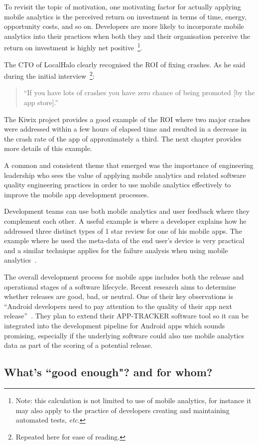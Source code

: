 To revisit the topic of motivation, one motivating factor for actually applying mobile analytics is the perceived return on investment in terms of time, energy, opportunity costs, and so on. Developers are more likely to incorporate mobile analytics into their practices when both they and their organisation perceive the return on investment is highly net positive~\footnote{Note: this calculation is not limited to use of mobile analytics, for instance it may also apply to the practice of developers creating and maintaining automated tests, \textit{etc}.}.

The CTO of LocalHalo clearly recognised the ROI of fixing crashes. As he said during the initial interview~\footnote{Repeated here for ease of reading.}: 

\begin{quote}
    ``If you have lots of crashes you have zero chance of being promoted [by the app store].''
\end{quote}

The Kiwix project provides a good example of the ROI where two major crashes were addressed within a few hours of elapsed time and resulted in a decrease in the crash rate of the app of approximately a third. The next chapter provides more details of this example.

A common and consistent theme that emerged was the importance of engineering leadership who sees the value of applying mobile analytics and related software quality engineering practices in order to use mobile analytics effectively to improve the mobile app development processes. 

Development teams can use both mobile analytics and user feedback where they complement each other. A useful example is where a developer explains how he addressed three distinct types of 1 star review for one of his mobile apps. The example where he used the meta-data of the end user's device is very practical and a similar technique applies for the failure analysis when using mobile analytics~\citep{sunderland2019_the_one_star_android_review}.

The overall development process for mobile apps includes both the release and operational stages of a software lifecycle. Recent research aims to determine whether releases are good, bad, or neutral. One of their key observations is ``Android developers need to pay attention to the quality of their app next release''~\citep[p. 31]{saidani2022_tracking_bad_updates_in_mobile_apps_a_search_based_approach}. They plan to extend their \uppercase{App-Tracker} software tool so it can be integrated into the development pipeline for Android apps which sounds promising, especially if the underlying software could also use mobile analytics data as part of the scoring of a potential release.

\dotfill 


\subsection{What's ``good enough"? and for whom?}